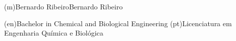 %
%
\ntauthorname(m){Bernardo Ribeiro}{Bernardo Ribeiro}



%
%
%
\ntauthordegree(en){Bachelor in Chemical and Biological Engineering}
\ntauthordegree(pt){Licenciatura em Engenharia Química e Biológica}



%
%
%

%
%



